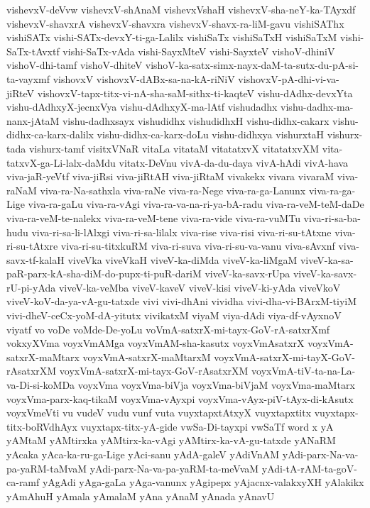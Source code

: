 {vishevxV-deVvw
vishevxV-shAnaM
vishevxVshaH
vishevxV-sha-neY-ka-TAyxdf
vishevxV-shavxrA
vishevxV-shavxra
vishevxV-shavx-ra-liM-gavu
vishiSAThx
vishiSATx
vishi-SATx-devxY-ti-ga-Lalilx
vishiSaTx
vishiSaTxH
vishiSaTxM
vishi-SaTx-tAvxtf
vishi-SaTx-vAda
vishi-SayxMteV
vishi-SayxteV
vishoV-dhiniV
vishoV-dhi-tamf
vishoV-dhiteV
vishoV-ka-satx-simx-nayx-daM-ta-sutx-du-pA-si-ta-vayxmf
vishovxV
vishovxV-dABx-sa-na-kA-riNiV
vishovxV-pA-dhi-vi-va-jiRteV
vishovxV-tapx-titx-vi-nA-sha-saM-sithx-ti-kaqteV
vishu-dAdhx-devxYta
vishu-dAdhxyX-jecnxVya
vishu-dAdhxyX-ma-lAtf
vishudadhx
vishu-dadhx-ma-nanx-jAtaM
vishu-dadhxsayx
vishudidhx
vishudidhxH
vishu-didhx-cakarx
vishu-didhx-ca-karx-dalilx
vishu-didhx-ca-karx-doLu
vishu-didhxya
vishurxtaH
vishurx-tada
vishurx-tamf
visitxVNaR
vitaLa
vitataM
vitatatxvX
vitatatxvXM
vita-tatxvX-ga-Li-lalx-daMdu
vitatx-DeVnu
vivA-da-du-daya
vivA-hAdi
vivA-hava
viva-jaR-yeVtf
viva-jiRsi
viva-jiRtAH
viva-jiRtaM
vivakekx
vivara
vivaraM
viva-raNaM
viva-ra-Na-sathxla
viva-raNe
viva-ra-Nege
viva-ra-ga-Lanunx
viva-ra-ga-Lige
viva-ra-gaLu
viva-ra-vAgi
viva-ra-va-na-ri-ya-bA-radu
viva-ra-veM-teM-daDe
viva-ra-veM-te-nalekx
viva-ra-veM-tene
viva-ra-vide
viva-ra-vuMTu
viva-ri-sa-ba-hudu
viva-ri-sa-li-lAlxgi
viva-ri-sa-lilalx
viva-rise
viva-risi
viva-ri-su-tAtxne
viva-ri-su-tAtxre
viva-ri-su-titxkuRM
viva-ri-suva
viva-ri-su-va-vanu
viva-sAvxnf
viva-savx-tf-kalaH
viveVka
viveVkaH
viveV-ka-diMda
viveV-ka-liMgaM
viveV-ka-sa-paR-parx-kA-sha-diM-do-pupx-ti-puR-dariM
viveV-ka-savx-rUpa
viveV-ka-savx-rU-pi-yAda
viveV-ka-veMba
viveV-kaveV
viveV-kisi
viveV-ki-yAda
viveVkoV
viveV-koV-da-ya-vA-gu-tatxde
vivi
vivi-dhAni
vividha
vivi-dha-vi-BArxM-tiyiM
vivi-dheV-ceCx-yoM-dA-yitutx
vivikatxM
viyaM
viya-dAdi
viya-df-vAyxnoV
viyatf
vo
voDe
voMde-De-yoLu
voVmA-satxrX-mi-tayx-GoV-rA-satxrXmf
vokxyXVma
voyxVmAMga
voyxVmAM-sha-kasutx
voyxVmAsatxrX
voyxVmA-satxrX-maMtarx
voyxVmA-satxrX-maMtarxM
voyxVmA-satxrX-mi-tayX-GoV-rAsatxrXM
voyxVmA-satxrX-mi-tayx-GoV-rAsatxrXM
voyxVmA-tiV-ta-na-La-va-Di-si-koMDa
voyxVma
voyxVma-biVja
voyxVma-biVjaM
voyxVma-maMtarx
voyxVma-parx-kaq-tikaM
voyxVma-vAyxpi
voyxVma-vAyx-piV-tAyx-di-kAsutx
voyxVmeVti
vu
vudeV
vudu
vunf
vuta
vuyxtapxtAtxyX
vuyxtapxtitx
vuyxtapx-titx-boRVdhAyx
vuyxtapx-titx-yA-gide
vwSa-Di-tayxpi
vwSaTf
word
x
yA
yAMtaM
yAMtirxka
yAMtirx-ka-vAgi
yAMtirx-ka-vA-gu-tatxde
yANaRM
yAcaka
yAca-ka-ru-ga-Lige
yAci-sanu
yAdA-galeV
yAdiVnAM
yAdi-parx-Na-va-pa-yaRM-taMvaM
yAdi-parx-Na-va-pa-yaRM-ta-meVvaM
yAdi-tA-rAM-ta-goV-ca-ramf
yAgAdi
yAga-gaLa
yAga-vanunx
yAgipepx
yAjacnx-valakxyXH
yAlakikx
yAmAhuH
yAmala
yAmalaM
yAna
yAnaM
yAnada
yAnavU
}
